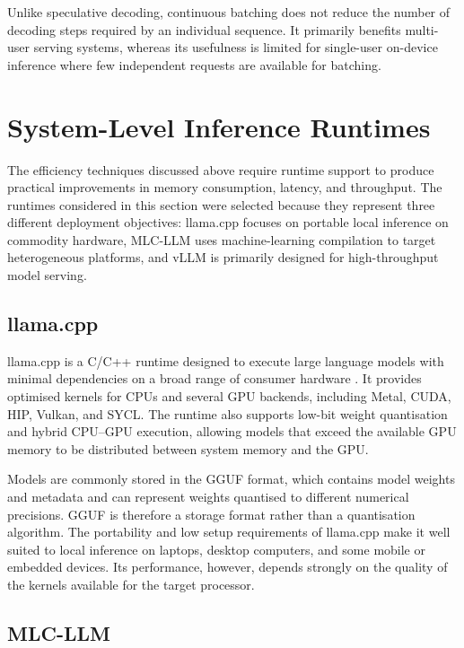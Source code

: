 Unlike speculative decoding, continuous batching does not reduce the number of
decoding steps required by an individual sequence. It primarily benefits
multi-user serving systems, whereas its usefulness is limited for single-user
on-device inference where few independent requests are available for batching.

\section{System-Level Inference Runtimes}
\label{sec:inference-runtimes}

The efficiency techniques discussed above require runtime support to produce
practical improvements in memory consumption, latency, and throughput. The
runtimes considered in this section were selected because they represent three
different deployment objectives: llama.cpp focuses on portable local inference
on commodity hardware, MLC-LLM uses machine-learning compilation to target
heterogeneous platforms, and vLLM is primarily designed for high-throughput
model serving.

\subsection{llama.cpp}
\label{sec:llama-cpp}

llama.cpp is a C/C++ runtime designed to execute large language models with
minimal dependencies on a broad range of consumer hardware
\cite{gerganov2023llamacpp}. It provides optimised kernels for CPUs and several
GPU backends, including Metal, CUDA, HIP, Vulkan, and SYCL. The runtime also
supports low-bit weight quantisation and hybrid CPU--GPU execution, allowing
models that exceed the available GPU memory to be distributed between system
memory and the GPU.

Models are commonly stored in the GGUF format, which contains model weights and
metadata and can represent weights quantised to different numerical
precisions. GGUF is therefore a storage format rather than a quantisation
algorithm. The portability and low setup requirements of llama.cpp make it
well suited to local inference on laptops, desktop computers, and some mobile
or embedded devices. Its performance, however, depends strongly on the quality
of the kernels available for the target processor.

\subsection{MLC-LLM}
\label{sec:mlc-llm}

